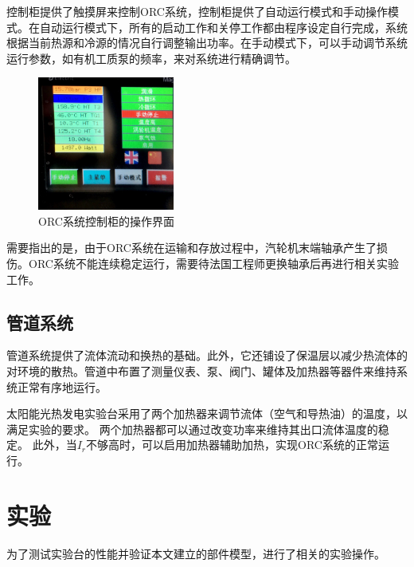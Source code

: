 控制柜提供了触摸屏来控制ORC系统，控制柜提供了自动运行模式和手动操作模式。在自动运行模式下，所有的启动工作和关停工作都由程序设定自行完成，系统根据当前热源和冷源的情况自行调整输出功率。在手动模式下，可以手动调节系统运行参数，如有机工质泵的频率，来对系统进行精确调节。

\begin{figure}[!ht]
\centering
\includegraphics[width=0.4\textwidth]{fig/ControlCabinet}
\caption{ORC系统控制柜的操作界面}\label{fig:ControlCabinet}
\end{figure}

需要指出的是，由于ORC系统在运输和存放过程中，汽轮机末端轴承产生了损伤。ORC系统不能连续稳定运行，需要待法国工程师更换轴承后再进行相关实验工作。

\subsection{管道系统}

管道系统提供了流体流动和换热的基础。此外，它还铺设了保温层以减少热流体的对环境的散热。管道中布置了测量仪表、泵、阀门、罐体及加热器等器件来维持系统正常有序地运行。

太阳能光热发电实验台采用了两个加热器来调节流体（空气和导热油）的温度，以满足实验的要求。
两个加热器都可以通过改变功率来维持其出口流体温度的稳定。
此外，当$I_r$不够高时，可以启用加热器辅助加热，实现ORC系统的正常运行。

\section{实验}

为了测试实验台的性能并验证本文建立的部件模型，进行了相关的实验操作。

